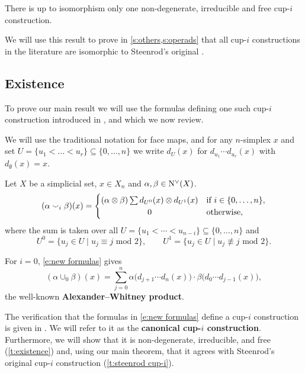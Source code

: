 \begin{theorem}\label{t:main}
	There is up to isomorphism only one non-degenerate, irreducible and free \mbox{cup-$i$} construction.
\end{theorem}

We will use this result to prove in \cref{s:others,s:operads} that all \mbox{cup-$i$} constructions in the literature are isomorphic to Steenrod's original \cite{steenrod1947products}.

\subsection{Existence}

To prove our main result we will use the formulas defining one such \mbox{cup-$i$} construction introduced in \cite{medina2023fast_sq}, and which we now review.

\begin{notation*}
	We will use the traditional notation for face maps, and for any $n$-simplex $x$ and set $U = \{u_1 < \dots < u_r\} \subseteq \big\{ 0, \dots, n \big\}$ we write $d_U(x)$ for $d_{u_1}\! \dotsm d_{u_r}(x)$ with $d_{\emptyset}(x) = x$.
\end{notation*}

\begin{definition} \label{d:my cup-i}
	Let $X$ be a simplicial set, $x \in X_n$ and $\alpha, \beta \in \operatorname{N^{\vee}}(X)$.
	\begin{equation}\label{e:new formulas}
	(\alpha \cup_i \beta)(x) =
	\begin{cases}
	(\alpha \ot \beta) \sum d_{U^0}(x) \ot d_{U^1}(x) &
	\text{if } i \in \{0, \dots, n\}, \\
	\hfil 0 &
	\text{otherwise},
	\end{cases}
	\end{equation}
	where the sum is taken over all $U = \{u_1 < \cdots < u_{n-i}\} \subseteq \{0, \dots, n\}$ and
	\begin{equation*}
	U^0 = \{u_j \in U \mid u_j \equiv j \text{ mod } 2\}, \qquad
	U^1 = \{u_j \in U \mid u_j \not\equiv j \text{ mod } 2\}.
	\end{equation*}
\end{definition}

\begin{example}
	For $i = 0$, \cref{e:new formulas} gives
	\begin{equation*}
	(\alpha \cup_0 \beta)(x) =
	\sum_{j=0}^n \alpha \big(d_{j+1} \cdots d_{n}(x)\big) \cdot \beta \big(d_{0} \cdots d_{j-1}(x)\big),
	\end{equation*}
	the well-known \textbf{Alexander--Whitney product}.
\end{example}

The verification that the formulas in \cref{e:new formulas} define a \mbox{cup-$i$} construction is given in \cite{medina2023fast_sq}.
We will refer to it as the \textbf{canonical \mbox{cup-$i$} construction}.
Furthermore, we will show that it is non-degenerate, irreducible, and free (\cref{t:existence}) and, using our main theorem, that it agrees with Steenrod's original cup-$i$ construction (\cref{t:steenrod cup-i}).
